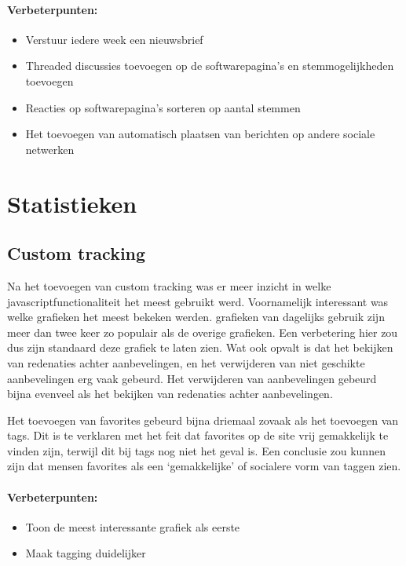 \documentclass[a4paper, 10pt, pdftex]{report}
\begin{document}
      \paragraph{\textbf{Verbeterpunten:}}
      \begin{itemize}
        \item Verstuur iedere week een nieuwsbrief
        \item Threaded discussies toevoegen op de softwarepagina's en stemmogelijkheden toevoegen
        \item Reacties op softwarepagina's sorteren op aantal stemmen
        \item Het toevoegen van automatisch plaatsen van berichten op andere sociale netwerken
      \end{itemize}


    \section{Statistieken}
    \subsection{Custom tracking}
    Na het toevoegen van custom tracking was er meer inzicht in welke javascriptfunctionaliteit het meest gebruikt werd. Voornamelijk interessant was welke grafieken het meest bekeken werden. grafieken van dagelijks gebruik zijn meer dan twee keer zo populair als de overige grafieken. Een verbetering hier zou dus zijn standaard deze grafiek te laten zien. Wat ook opvalt is dat het bekijken van redenaties achter aanbevelingen, en het verwijderen van niet geschikte aanbevelingen erg vaak gebeurd. Het verwijderen van aanbevelingen gebeurd bijna evenveel als het bekijken van redenaties achter aanbevelingen.

    Het toevoegen van favorites gebeurd bijna driemaal zovaak als het toevoegen van tags. Dit is te verklaren met het feit dat favorites op de site vrij gemakkelijk te vinden zijn, terwijl dit bij tags nog niet het geval is. Een conclusie zou kunnen zijn dat mensen favorites als een `gemakkelijke' of socialere vorm van taggen zien.

    \paragraph{\textbf{Verbeterpunten:}}
      \begin{itemize}
        \item Toon de meest interessante grafiek als eerste
        \item Maak tagging duidelijker
      \end{itemize}
\end{document}
